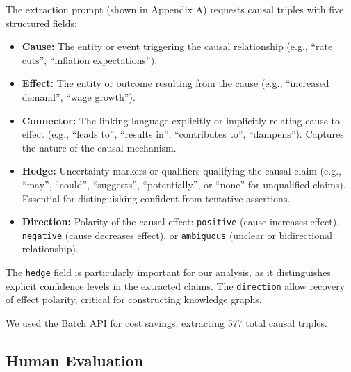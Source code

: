 \documentclass[11pt]{article}
\begin{document}
The extraction prompt (shown in Appendix A) requests causal triples with five structured fields:

\begin{itemize}
    \item \textbf{Cause:} The entity or event triggering the causal relationship (e.g., ``rate cuts'', ``inflation expectations'').
    \item \textbf{Effect:} The entity or outcome resulting from the cause (e.g., ``increased demand'', ``wage growth'').
    \item \textbf{Connector:} The linking language explicitly or implicitly relating cause to effect (e.g., ``leads to'', ``results in'', ``contributes to'', ``dampens''). Captures the nature of the causal mechanism.
    \item \textbf{Hedge:} Uncertainty markers or qualifiers qualifying the causal claim (e.g., ``may'', ``could'', ``suggests'', ``potentially'', or ``none'' for unqualified claims). Essential for distinguishing confident from tentative assertions.
    \item \textbf{Direction:} Polarity of the causal effect: \texttt{positive} (cause increases effect), \texttt{negative} (cause decreases effect), or \texttt{ambiguous} (unclear or bidirectional relationship).
\end{itemize}

The \texttt{hedge} field is particularly important for our analysis, as it distinguishes explicit confidence levels in the extracted claims. The \texttt{direction} allow recovery of effect polarity, critical for constructing knowledge graphs.

We used the Batch API for cost savings, extracting 577 total causal triples.

\subsection{Human Evaluation}
\end{document}
